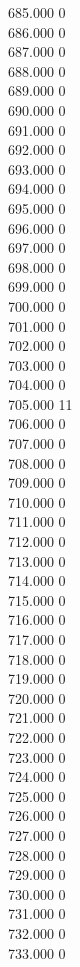 { 685.000	0 \\
 686.000	0 \\
 687.000	0 \\
 688.000	0 \\
 689.000	0 \\
 690.000	0 \\
 691.000	0 \\
 692.000	0 \\
 693.000	0 \\
 694.000	0 \\
 695.000	0 \\
 696.000	0 \\
 697.000	0 \\
 698.000	0 \\
 699.000	0 \\
 700.000	0 \\
 701.000	0 \\
 702.000	0 \\
 703.000	0 \\
 704.000	0 \\
 705.000	11 \\
 706.000	0 \\
 707.000	0 \\
 708.000	0 \\
 709.000	0 \\
 710.000	0 \\
 711.000	0 \\
 712.000	0 \\
 713.000	0 \\
 714.000	0 \\
 715.000	0 \\
 716.000	0 \\
 717.000	0 \\
 718.000	0 \\
 719.000	0 \\
 720.000	0 \\
 721.000	0 \\
 722.000	0 \\
 723.000	0 \\
 724.000	0 \\
 725.000	0 \\
 726.000	0 \\
 727.000	0 \\
 728.000	0 \\
 729.000	0 \\
 730.000	0 \\
 731.000	0 \\
 732.000	0 \\
 733.000	0 \\
}

